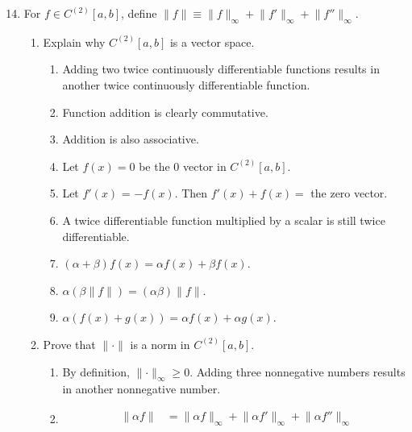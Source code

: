 \documentclass{article}
\begin{document}
\begin{enumerate}
            \setcounter{enumi}{13}
      \item For $f\in C^{(2)}[a,b]$, define $\lVert f\rVert
                  \equiv\lVert f\rVert_\infty + \lVert f'\rVert_\infty
                  + \lVert f''\rVert_\infty$.
            \begin{enumerate}
                  \item Explain why $C^{(2)}[a,b]$ is a vector space.
                        \begin{enumerate}
                              \item Adding two twice continuously differentiable
                                    functions results in another twice continuously
                                    differentiable function.
                              \item Function addition is clearly commutative.
                              \item Addition is also associative.
                              \item Let $f(x)=0$ be the 0 vector in $C^{(2)}[a,b]$.
                              \item Let $f'(x)$ = $-f(x)$. Then $f'(x)+f(x)=$ the zero vector.
                              \item A twice differentiable function multiplied by a scalar is still twice differentiable.
                              \item $(\alpha+\beta)f(x) = \alpha f(x) + \beta f(x)$.
                              \item $\alpha(\beta \lVert f\rVert) = (\alpha\beta) \lVert f\rVert$.
                              \item $\alpha (f(x)+g(x)) = \alpha f(x) + \alpha g(x)$.
                        \end{enumerate}
                  \item Prove that $\lVert\cdot\rVert$ is a norm in
                        $C^{(2)}[a,b]$.
                        \begin{enumerate}
                              \item By definition, $\lVert\cdot\rVert_\infty\geq 0$.
                                    Adding three nonnegative numbers results in another
                                    nonnegative number.
                              \item \begin{align*}
                                          \lVert \alpha f\rVert & = \lVert\alpha f\rVert_\infty + \lVert\alpha f'\rVert_\infty + \lVert\alpha f''\rVert_\infty                                     \\

\end{align*}
\end{enumerate}
\end{enumerate}
\end{enumerate}
\end{document}
